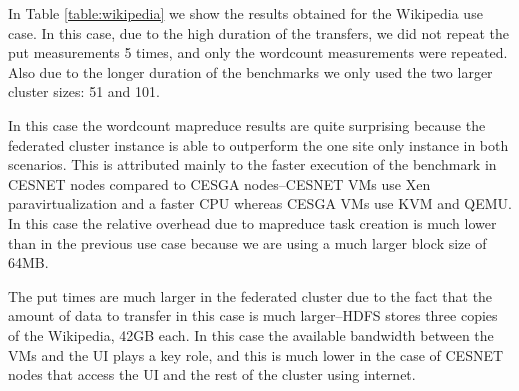 \documentclass[oribibl]{llncs_Ibergrid2013}
\begin{document}
In Table \ref{table:wikipedia} we show the results obtained for the Wikipedia use case. In this case, due to the high duration of the transfers, we did not repeat the put measurements 5 times, and only the wordcount measurements were repeated. Also due to the longer duration of the benchmarks we only used the two larger cluster sizes: 51 and 101.

In this case the wordcount mapreduce results are quite surprising because the federated cluster instance is able to outperform the one site only instance in both scenarios. This is attributed mainly to the faster execution of the benchmark in CESNET nodes compared to CESGA nodes--CESNET VMs use Xen paravirtualization and a faster CPU whereas CESGA VMs use KVM and QEMU. In this case the relative overhead due to mapreduce task creation is much lower than in the previous use case because we are using a much larger block size of 64MB.

The put times are much larger in the federated cluster due to the fact that the amount of data to transfer in this case is much larger--HDFS stores three copies of the Wikipedia, 42GB each. In this case the available bandwidth between the VMs and the UI plays a key role, and this is much lower in the case of CESNET nodes that access the UI and the rest of the cluster using internet.
\end{document}
